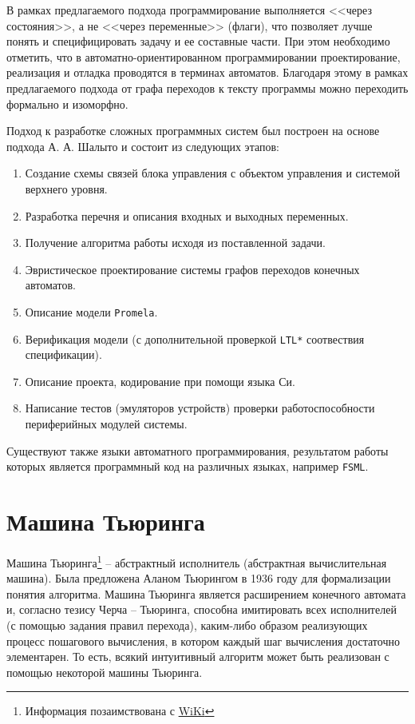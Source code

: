 \documentclass[12pt, twoside]{report}
\begin{document}
В рамках предлагаемого подхода программирование выполняется <<через состояния>>, а не <<через переменные>> (флаги),
что позволяет лучше понять и специфицировать задачу и ее составные части. При этом необходимо отметить,
что в автоматно-ориентированном программировании проектирование, реализация и отладка проводятся в
терминах автоматов. Благодаря этому в рамках предлагаемого подхода от графа переходов к тексту
программы можно переходить формально и изоморфно.

Подход к разработке сложных программных систем был построен на основе подхода А. А. Шалыто\cite{Shalito:AutomataProgramming} и
состоит из следующих этапов:
\begin{enumerate}
  \item Создание схемы связей блока управления с объектом управления и системой верхнего уровня.
  \item Разработка перечня и описания входных и выходных переменных.
  \item Получение алгоритма работы исходя из поставленной задачи.
  \item Эвристическое проектирование системы графов переходов конечных автоматов.
  \item Описание модели \texttt{Promela}.
  \item Верификация модели (с дополнительной проверкой \texttt{LTL*} соотвествия спецификации).
  \item Описание проекта, кодирование при помощи языка Си.
  \item Написание тестов (эмуляторов устройств) проверки работоспособности периферийных модулей системы.
\end{enumerate}

Существуют также языки автоматного программирования, результатом работы которых является программный
код на различных языках, например \texttt{FSML}\cite{Lagunov:FSML}.

\chapter*{Машина Тьюринга}

Машина Тьюринга\footnote{Информация позаимствована с \href{https://en.wikipedia.org/wiki/Turing\_machine}{WiKi}} -- абстрактный исполнитель (абстрактная вычислительная машина). Была предложена Аланом Тьюрингом в 1936 году для формализации понятия алгоритма.
Машина Тьюринга является расширением конечного автомата и, согласно тезису Черча -- Тьюринга, способна имитировать всех исполнителей (с помощью задания правил перехода), каким-либо образом реализующих процесс пошагового вычисления, в котором каждый шаг вычисления достаточно элементарен. То есть, всякий интуитивный алгоритм может быть реализован с помощью некоторой машины Тьюринга.
\end{document}
